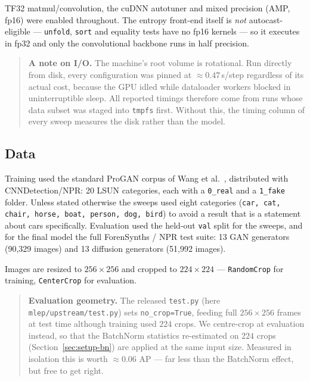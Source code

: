 TF32 matmul/convolution, the cuDNN autotuner and mixed precision (AMP, fp16)
were enabled throughout. The entropy front-end itself is \emph{not}
autocast-eligible --- \texttt{unfold}, \texttt{sort} and equality tests have no
fp16 kernels --- so it executes in fp32 and only the convolutional backbone runs
in half precision.

\begin{quote}\small
\textbf{A note on I/O.} The machine's root volume is rotational. Run directly
from disk, every configuration was pinned at $\approx0.47$\,s/step regardless of
its actual cost, because the GPU idled while dataloader workers blocked in
uninterruptible sleep. All reported timings therefore come from runs whose data
subset was staged into \texttt{tmpfs} first. Without this, the timing column of
every sweep measures the disk rather than the model.
\end{quote}

\subsection{Data}

Training used the standard ProGAN corpus of Wang et al.~\cite{wang2020cnn},
distributed with CNNDetection/NPR: 20 LSUN categories, each with a
\texttt{0\_real} and a \texttt{1\_fake} folder. Unless stated otherwise the
sweeps used eight categories (\texttt{car, cat, chair, horse, boat, person,
dog, bird}) to avoid a result that is a statement about cars specifically.
Evaluation used the held-out \texttt{val} split for the sweeps, and for the
final model the full ForenSynths / NPR test suite: 13 GAN generators
(90{,}329 images) and 13 diffusion generators (51{,}992 images).

Images are resized to $256\times256$ and cropped to $224\times224$ ---
\texttt{RandomCrop} for training, \texttt{CenterCrop} for evaluation.

\begin{quote}\small
\textbf{Evaluation geometry.} The released \texttt{test.py} (here \texttt{mlep/upstream/test.py}) sets
\texttt{no\_crop=True}, feeding full $256\times256$ frames at test time although
training used $224$ crops. We centre-crop at evaluation instead, so that the
BatchNorm statistics re-estimated on $224$ crops (Section~\ref{sec:setup-bn})
are applied at the same input size. Measured in isolation this is worth
$\approx0.06$ AP --- far less than the BatchNorm effect, but free to get right.
\end{quote}


